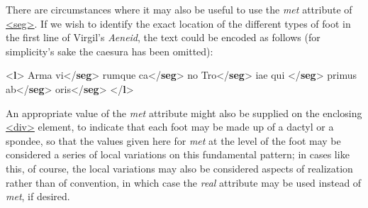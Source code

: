 There are circumstances where it may also be useful to use the {\itshape met} attribute of \hyperref[TEI.seg]{<seg>}. If we wish to identify the exact location of the different types of foot in the first line of Virgil's \textit{Aeneid}, the text could be encoded as follows (for simplicity's sake the caesura has been omitted): \par\bgroup{}\exampleFont \begin{shaded}\noindent\mbox{}{<\textbf{l}>}\mbox{}\newline 
{}Arma vi{</\textbf{seg}>}\mbox{}\newline 
{}rumque ca{</\textbf{seg}>}\mbox{}\newline 
{}no Tro{</\textbf{seg}>}\mbox{}\newline 
{}iae qui {</\textbf{seg}>}\mbox{}\newline 
{}primus ab{</\textbf{seg}>}\mbox{}\newline 
{} oris{</\textbf{seg}>}\mbox{}\newline 
{</\textbf{l}>}\end{shaded}\egroup\par \noindent  An appropriate value of the {\itshape met} attribute might also be supplied on the enclosing \hyperref[TEI.div]{<div>} element, to indicate that each foot may be made up of a dactyl or a spondee, so that the values given here for {\itshape met} at the level of the foot may be considered a series of local variations on this fundamental pattern; in cases like this, of course, the local variations may also be considered aspects of realization rather than of convention, in which case the {\itshape real} attribute may be used instead of {\itshape met}, if desired.
